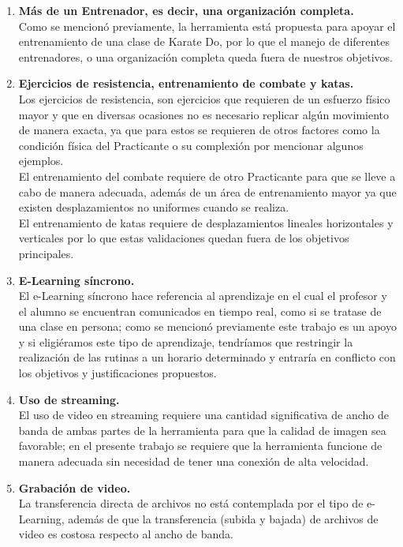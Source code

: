 \begin{enumerate}
	\item \textbf{\textcolor[rgb]{0, 0, 0.545098}{Más de un Entrenador, es decir, una organización completa.}}\\
	Como se mencionó previamente, la herramienta está propuesta para apoyar el entrenamiento de una clase de Karate Do, por lo que el manejo de diferentes entrenadores, o una organización completa queda fuera de nuestros objetivos.\\
	\item \textbf{\textcolor[rgb]{0, 0, 0.545098}{Ejercicios de resistencia, entrenamiento de combate y katas.}}\\
	Los ejercicios de resistencia, son ejercicios que requieren de un esfuerzo físico mayor y que en diversas ocasiones no es necesario replicar algún movimiento de manera exacta, ya que para estos se requieren de otros factores como la condición física del Practicante o su complexión por mencionar algunos ejemplos.\\
El entrenamiento del combate requiere de otro Practicante para que se lleve a cabo de manera adecuada, además de un área de entrenamiento mayor ya que existen desplazamientos no uniformes cuando se realiza.\\
El entrenamiento de katas requiere de desplazamientos lineales horizontales y verticales por lo que estas validaciones quedan fuera de los objetivos principales.\\
	\item \textbf{\textcolor[rgb]{0, 0, 0.545098}{E-Learning síncrono.}}\\
	El e-Learning síncrono hace referencia al aprendizaje en el cual el profesor y el alumno se encuentran comunicados en tiempo real, como si se tratase de una clase en persona; como se mencionó previamente este trabajo es un apoyo y si eligiéramos este tipo de aprendizaje, tendríamos que restringir la realización de las rutinas a un horario determinado y entraría en conflicto con los objetivos y justificaciones propuestos.\\
	\item \textbf{\textcolor[rgb]{0, 0, 0.545098}{Uso de streaming.}}\\
	El uso de video en streaming requiere una cantidad significativa de ancho de banda de ambas partes de la herramienta para que la calidad de imagen sea favorable; en el presente trabajo se requiere que la herramienta funcione de manera adecuada sin necesidad de tener una conexión de alta velocidad.\\
	\item \textbf{\textcolor[rgb]{0, 0, 0.545098}{Grabación de video.}}\\
	La transferencia directa de archivos no está contemplada por el tipo de e-Learning, además de que la transferencia (subida y bajada) de archivos de video es costosa respecto al ancho de banda.\\
\end{enumerate}
\clearpage


